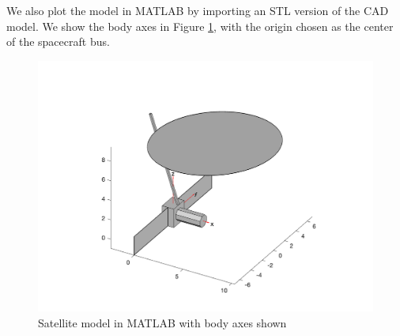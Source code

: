 We also plot the model in MATLAB by importing an STL version of the CAD model. We show the body axes in Figure \ref{fig:MATLAB_model}, with the origin chosen as the center of the spacecraft bus.

\begin{figure}[H]
\centering
\includegraphics[scale=0.7]{Images/ps1_model.png}
\caption{Satellite model in MATLAB with body axes shown}
\label{fig:MATLAB_model}
\end{figure}

